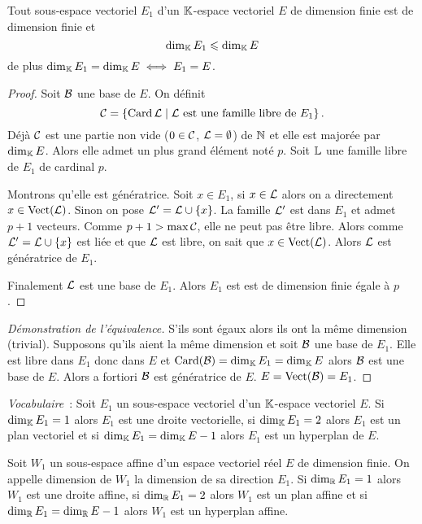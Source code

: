 \begin{theo}
  Tout sous-espace vectoriel \(E_1\) d'un \(\mathbb{K}\)-espace vectoriel \(E\) de dimension finie est de dimension finie et
  \begin{equation}
    \operatorname{dim}_{\mathbb{K}} E_1 \leqslant \operatorname{dim}_{\mathbb{K}} E
  \end{equation}
  de plus \(\operatorname{dim}_{\mathbb{K}} E_1 = \operatorname{dim}_{\mathbb{K}} E \iff E_1 =E\).
\end{theo}
\begin{proof}
  Soit \(\mathcal{B}\) une base de \(E\). On définit 
  \begin{equation}
    \mathcal{C}=\left\{\operatorname{Card} \mathcal{L}\mathrel{}\middle|\mathrel{}\mathcal{L} \text{~est une famille libre de } E_1\right\}. 
  \end{equation}
  Déjà \(\mathcal{C}\) est une partie non vide (\(0 \in \mathcal{C}\), \(\mathcal{L}=\emptyset\)) de \(\mathbb{N}\) et elle est majorée par \(\operatorname{dim}_{\mathbb{K}} E\). Alors elle admet un plus grand élément noté \(p\). Soit \(\mathbb{L}\) une famille libre de \(E_1\) de cardinal \(p\). 

  Montrons qu'elle est génératrice. Soit \(x \in E_1\), si \(x \in \mathcal{L}\) alors on a directement \(x \in \operatorname{Vect}(\mathcal{L})\). Sinon on pose \(\mathcal{L}' = \mathcal{L} \cup \{x\}\). La famille \(\mathcal{L}'\) est dans \(E_1\) et admet \(p+1\) vecteurs. Comme \(p+1 > \max \mathcal{C}\), elle ne peut pas être libre. Alors comme \(\mathcal{L}' =\mathcal{L}\cup\{x\}\) est liée et que \(\mathcal{L}\) est libre, on sait que \(x \in \operatorname{Vect}(\mathcal{L})\). Alors \(\mathcal{L}\) est génératrice de \(E_1\).

  Finalement \(\mathcal{L}\) est une base de \(E_1\). Alors \(E_1\) est est de dimension finie égale à \(p\).
\end{proof}
\begin{proof}[Démonstration de l'équivalence]
  S'ils sont égaux alors ils ont la même dimension (trivial). Supposons qu'ils aient la même dimension et soit \(\mathcal{B}\) une base de \(E_1\). Elle est libre dans \(E_1\) donc dans \(E\) et \(\operatorname{Card}(\mathcal{B})=\operatorname{dim}_{\mathbb{K}} E_1=\operatorname{dim}_{\mathbb{K}} E\) alors \(\mathcal{B}\) est une base de \(E\). Alors a fortiori \(\mathcal{B}\) est génératrice de \(E\). \(E=\operatorname{Vect}(\mathcal{B})=E_1\).
\end{proof}

\emph{Vocabulaire}~: Soit \(E_1\) un sous-espace vectoriel d'un \(\mathbb{K}\)-espace vectoriel \(E\). Si \(\operatorname{dim}_{\mathbb{K}} E_1=1\) alors \(E_1\) est une droite vectorielle, si \(\operatorname{dim}_{\mathbb{K}} E_1=2\) alors \(E_1\) est un plan vectoriel et si \(\operatorname{dim}_{\mathbb{K}} E_1 = \operatorname{dim}_{\mathbb{K}} E -1\) alors \(E_1\) est un hyperplan de \(E\).

\begin{defdef}
  Soit \(W_1\) un sous-espace affine d'un espace vectoriel réel \(E\) de dimension finie. On appelle dimension de \(W_1\) la dimension de sa direction \(E_1\). Si \(\operatorname{dim}_{\mathbb{R}} E_1=1\) alors \(W_1\) est une droite affine, si \(\operatorname{dim}_{\mathbb{R}} E_1=2\) alors \(W_1\) est un plan affine et si \(\operatorname{dim}_{\mathbb{R}} E_1=\operatorname{dim}_{\mathbb{R}} E -1 \) alors \(W_1\) est un hyperplan affine.
\end{defdef}

